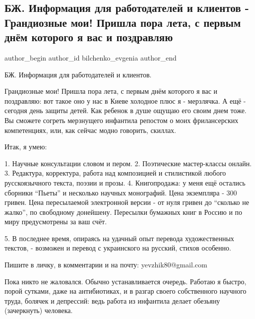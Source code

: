  
 
 
 
 
 
\subsection{БЖ. Информация для работодателей и клиентов - Грандиозные мои! Пришла пора лета, с первым днём которого я вас и поздравляю}
\label{sec:01_06_2021.fb.bilchenko_evgenia.1.leto_kiev_holod_pozdravlenie_rabota}
\ifcmt
 author_begin
   author_id bilchenko_evgenia
 author_end
\fi

БЖ. Информация для работодателей и клиентов.

Грандиозные мои! Пришла пора лета, с первым днём которого я вас и поздравляю:
вот такое оно у нас в Киеве холодное плюс я - мерзлячка. А ещё - сегодня день
защиты детей. Как ребенок в душе ощущаю его своим днем тоже. Вы сможете согреть
мерзнущего инфантила репостом о моих фрилансерских компетенциях, или, как
сейчас модно говорить, скиллах.

Итак, я умею:

1. Научные консультации словом и пером.
2. Поэтические мастер-классы онлайн.
3. Редактура, корректура, работа над композицией и стилистикой любого русскоязычного текста, поэзии и прозы.
4. Книгопродажа: у меня ещё остались сборники \enquote{Пьеты} и несколько научных
монографий. Цена экземпляра - 300 гривен. Цена пересылаемой электронной версии
- от нуля гривен до \enquote{сколько не жалко}, по свободному донейшену. Пересылки
бумажных книг в Россию и по миру предусмотрены за ваш счёт.

5. В последнее время, опираясь на удачный опыт перевода художественных текстов, - возможен и перевод с украинского на русский, стихов особенно.

Пишите в личку, в комментарии и на почту: yevzhik80@gmail.com

Пока никто не жаловался. Обычно устанавливается очередь. Работаю я быстро,
порой сутками, даже на антибиотиках, и в разгар своего собственного научного
труда, болячек и депрессий: ведь работа из инфантила делает обезьяну
(зачеркнуть) человека.

